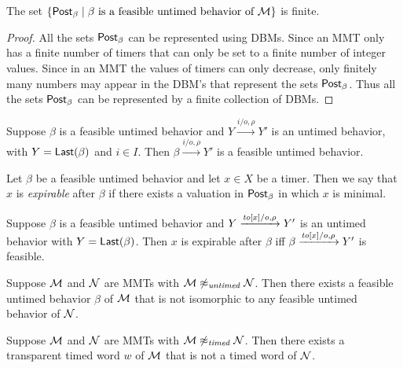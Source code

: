 \begin{lemma}
\label{lemma finitely many zones}
The set
$\{ \mathsf{Post}_{\beta} \mid \beta \mbox{ is a feasible untimed behavior of } {\mathcal M} \}$ is finite.
\end{lemma}

\begin{proof}
All the sets $\mathsf{Post}_{\beta}$ can be represented using DBMs. Since an MMT only has a finite number of timers that can only be set to a finite number of integer values. Since in an MMT the values of timers can only decrease, only finitely many numbers may
appear in the DBM's that represent the sets $\mathsf{Post}_{\beta}$. Thus all the sets $\mathsf{Post}_{\beta}$ can be represented by a finite
collection of DBMs.
\end{proof}

\begin{lemma}
Suppose $\beta$ is a feasible untimed behavior and $Y \xrightarrow{i/o, \rho} Y'$ is an untimed behavior,
with $Y = \mathsf{Last}({\beta})$ and $i \in I$.
Then $\beta \xrightarrow{i/o, \rho} Y'$ is a feasible untimed behavior.
\end{lemma}

Let $\beta$ be a feasible untimed behavior and let $x \in X$ be a timer. Then we say that $x$ is \emph{expirable} after $\beta$
if there exists a valuation in $\mathsf{Post}_{\beta}$ in which $x$ is minimal.

\begin{lemma}
Suppose $\beta$ is a feasible untimed behavior and $Y \xrightarrow{\mathit{to}[x]/o, \rho} Y'$ is an untimed behavior 
with $Y = \mathsf{Last}({\beta})$.
Then $x$ is expirable after $\beta$ iff $\beta \xrightarrow{\mathit{to}[x]/o, \rho} Y'$ is feasible.
\end{lemma}

\begin{lemma}
\label{not untimed}
Suppose ${\mathcal M}$ and ${\mathcal N}$ are MMTs with ${\mathcal M} \not\approx_{\mathit{untimed}} {\mathcal N}$.
Then there exists a feasible untimed behavior $\beta$ of ${\mathcal M}$ that is not isomorphic to any feasible untimed
behavior of ${\mathcal N}$.
\end{lemma}

\begin{lemma}
\label{not timed}
Suppose ${\mathcal M}$ and ${\mathcal N}$ are MMTs with ${\mathcal M} \not\approx_{\mathit{timed}} {\mathcal N}$.
Then there exists a transparent timed word $w$ of ${\mathcal M}$ that is not a timed word of ${\mathcal N}$.
\end{lemma}

\fi
